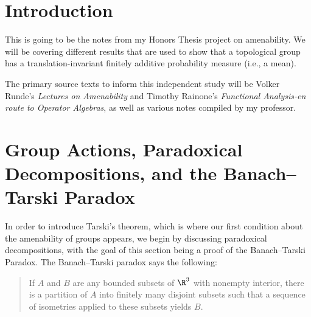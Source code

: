 \documentclass[10pt]{mypackage}
\begin{document}
\RaggedRight
\tableofcontents
\section{Introduction}%
This is going to be the notes from my Honors Thesis project on amenability. We will be covering different results that are used to show that a topological group has a translation-invariant finitely additive probability measure (i.e., a mean).\newline

The primary source texts to inform this independent study will be Volker Runde's \textit{Lectures on Amenability} and Timothy Rainone's \textit{Functional Analysis-en route to Operator Algebras}, as well as various notes compiled by my professor.
\section{Group Actions, Paradoxical Decompositions, and the Banach--Tarski Paradox}%
In order to introduce Tarski's theorem, which is where our first condition about the amenability of groups appears, we begin by discussing paradoxical decompositions, with the goal of this section being a proof of the Banach--Tarski Paradox. The Banach--Tarski paradox says the following:
\begin{quote}
  If $A$ and $B$ are any bounded subsets of $\R^{3}$ with nonempty interior, there is a partition of $A$ into finitely many disjoint subsets such that a sequence of isometries applied to these subsets yields $B$.
\end{quote}
\end{document}
